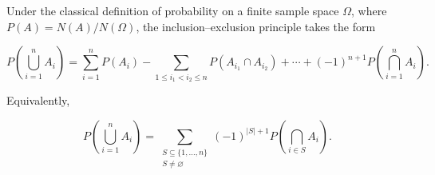 Under the classical definition of probability on a finite sample space $\Omega$, where $P(A) = N(A)/N(\Omega)$, the inclusion–exclusion principle takes the form

$$P\left(\bigcup_{i=1}^{n} A_i\right) = \sum_{i=1}^{n} P(A_i) - \sum_{1 \leq i_1 < i_2 \leq n} P(A_{i_1} \cap A_{i_2}) + \cdots + (-1)^{n+1} P\left(\bigcap_{i=1}^{n} A_i\right).$$

Equivalently,

$$P\left(\bigcup_{i=1}^{n} A_i\right) = \sum_{\substack{S \subseteq \{1,\ldots,n\} \\ S \neq \varnothing}} (-1)^{|S|+1} P\left(\bigcap_{i \in S} A_i\right).$$
